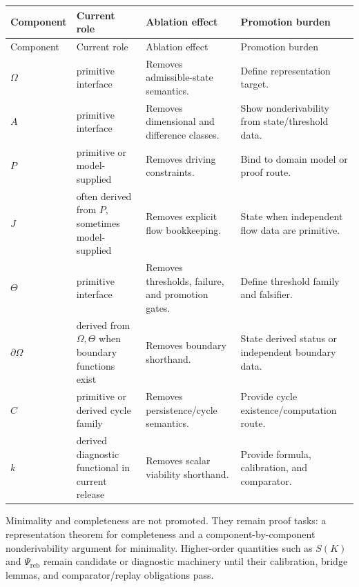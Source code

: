 \begin{longtable}{@{}p{}p{}p{}p{}@{}}
\toprule
Component & Current role & Ablation effect & Promotion burden \\
\midrule
\endfirsthead
\toprule
Component & Current role & Ablation effect & Promotion burden \\
\midrule
\endhead
\(\Omega\) & primitive interface & Removes admissible-state semantics. & Define representation target. \\
\(A\) & primitive interface & Removes dimensional and difference classes. & Show nonderivability from state/threshold data. \\
\(P\) & primitive or model-supplied & Removes driving constraints. & Bind to domain model or proof route. \\
\(J\) & often derived from \(P\), sometimes model-supplied & Removes explicit flow bookkeeping. & State when independent flow data are primitive. \\
\(\Theta\) & primitive interface & Removes thresholds, failure, and promotion gates. & Define threshold family and falsifier. \\
\(\partial\Omega\) & derived from \(\Omega,\Theta\) when boundary functions exist & Removes boundary shorthand. & State derived status or independent boundary data. \\
\(C\) & primitive or derived cycle family & Removes persistence/cycle semantics. & Provide cycle existence/computation route. \\
\(k\) & derived diagnostic functional in current release & Removes scalar viability shorthand. & Provide formula, calibration, and comparator. \\
\bottomrule
\end{longtable}

Minimality and completeness are not promoted. They remain proof tasks:
a representation theorem for completeness and a component-by-component
nonderivability argument for minimality. Higher-order quantities such as
\(S(K)\) and \(\Psi_{\mathrm{reb}}\) remain candidate or diagnostic machinery
until their calibration, bridge lemmas, and comparator/replay obligations pass.
